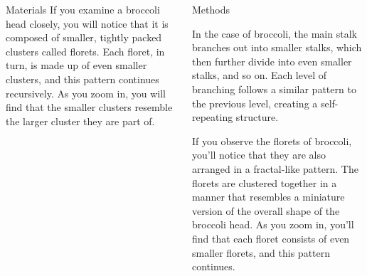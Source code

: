 \documentclass[]{beamer}
\begin{document}
\begin{frame}[t]
\begin{columns}[t]
\begin{column}{\twocolwid}
\begin{columns}[t,totalwidth=\twocolwid]
\begin{column}{\onecolwid}
\begin{block}{Materials}
     If you examine a broccoli head closely, you will notice that it is composed of smaller, tightly packed clusters called florets. Each floret, in turn, is made up of even smaller clusters, and this pattern continues recursively. As you zoom in, you will find that the smaller clusters resemble the larger cluster they are part of.
    
    \end{block}
    
    
    \end{column} %
        
    \begin{column}{\onecolwid}\vspace{-.6in} %
    
    
    \begin{block}{Methods}
    
    In the case of broccoli, the main stalk branches out into smaller stalks, which then further divide into even smaller stalks, and so on. Each level of branching follows a similar pattern to the previous level, creating a self-repeating structure.

If you observe the florets of broccoli, you'll notice that they are also arranged in a fractal-like pattern. The florets are clustered together in a manner that resembles a miniature version of the overall shape of the broccoli head. As you zoom in, you'll find that each floret consists of even smaller florets, and this pattern continues.

    
    \end{block}
    
    
    \end{column} %
    
    \end{columns} %
    
    

\end{column}
\end{columns}
\end{frame}
\end{document}
